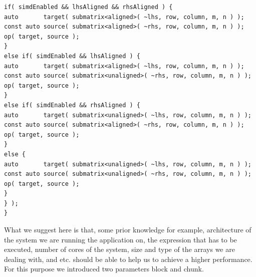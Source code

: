 \begin{lstlisting}[float,floatplacement=H,caption= {Previous implementation of Assign function for HPX backend in Blaze.}, label={old_hpx_backend}]
if( simdEnabled && lhsAligned && rhsAligned ) {
auto       target( submatrix<aligned>( ~lhs, row, column, m, n ) );
const auto source( submatrix<aligned>( ~rhs, row, column, m, n ) );
op( target, source );
}
else if( simdEnabled && lhsAligned ) {
auto       target( submatrix<aligned>( ~lhs, row, column, m, n ) );
const auto source( submatrix<unaligned>( ~rhs, row, column, m, n ) );
op( target, source );
}
else if( simdEnabled && rhsAligned ) {
auto       target( submatrix<unaligned>( ~lhs, row, column, m, n ) );
const auto source( submatrix<aligned>( ~rhs, row, column, m, n ) );
op( target, source );
}
else {
auto       target( submatrix<unaligned>( ~lhs, row, column, m, n ) );
const auto source( submatrix<unaligned>( ~rhs, row, column, m, n ) );
op( target, source );
}
} );
}
\end{lstlisting}

What we suggest here is that, some prior knowledge for example, architecture of the system we are running the application on, the expression that has to be executed, number of cores of the system, size and type of the arrays we are dealing with, and etc. should be able to help us to achieve a higher performance.
For this purpose we introduced two parameters block and chunk.

